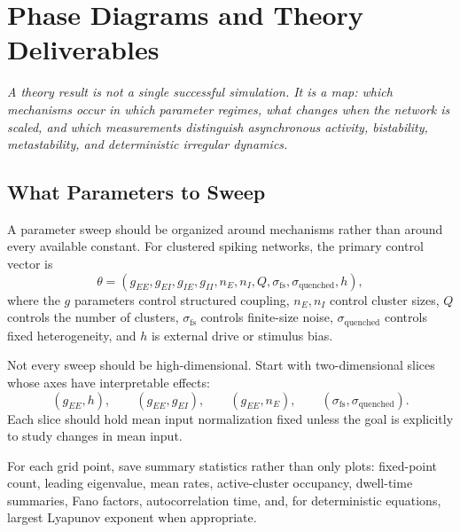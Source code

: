 \chapter{Phase Diagrams and Theory Deliverables}
\label{ch:phase-diagrams-theory-deliverables}

\textit{A theory result is not a single successful simulation. It is a map: which mechanisms occur in which parameter regimes, what changes when the network is scaled, and which measurements distinguish asynchronous activity, bistability, metastability, and deterministic irregular dynamics.}

\section{What Parameters to Sweep}
\label{sec:what-parameters-to-sweep}

A parameter sweep should be organized around mechanisms rather than around every available constant. For clustered spiking networks, the primary control vector is
%
\begin{equation}
  \theta
  =
  \left(
  g_{EE},
  g_{EI},
  g_{IE},
  g_{II},
  n_E,
  n_I,
  Q,
  \sigma_{\mathrm{fs}},
  \sigma_{\mathrm{quenched}},
  h
  \right),
  \label{eq:phase-diagram-parameter-vector}
\end{equation}
%
where the $g$ parameters control structured coupling, $n_E,n_I$ control cluster sizes, $Q$ controls the number of clusters, $\sigma_{\mathrm{fs}}$ controls finite-size noise, $\sigma_{\mathrm{quenched}}$ controls fixed heterogeneity, and $h$ is external drive or stimulus bias.

Not every sweep should be high-dimensional. Start with two-dimensional slices whose axes have interpretable effects:
%
\begin{equation}
  (g_{EE},h),
  \qquad
  (g_{EE},g_{EI}),
  \qquad
  (g_{EE},n_E),
  \qquad
  (\sigma_{\mathrm{fs}},\sigma_{\mathrm{quenched}}).
  \label{eq:recommended-phase-slices}
\end{equation}
%
Each slice should hold mean input normalization fixed unless the goal is explicitly to study changes in mean input.

For each grid point, save summary statistics rather than only plots: fixed-point count, leading eigenvalue, mean rates, active-cluster occupancy, dwell-time summaries, Fano factors, autocorrelation time, and, for deterministic equations, largest Lyapunov exponent when appropriate.

